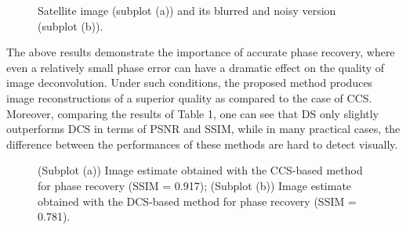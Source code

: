 \pdfoutput=1 \documentclass[journal]{IEEEtran}
\begin{document}
\begin{figure}[!t]
\caption{Satellite image (subplot (a)) and its blurred and noisy version (subplot (b)).}
\label{fig12}
\end{figure}

The above results demonstrate the importance of accurate phase recovery, where even a relatively small phase error can have a dramatic effect on the quality of image deconvolution. Under such conditions, the proposed method produces image reconstructions of a superior quality as compared to the case of CCS. Moreover, comparing the results of Table 1, one can see that DS only slightly outperforms DCS in terms of PSNR and SSIM, while in many practical cases, the difference between the performances of these methods are hard to detect visually.

\begin{figure}[t]
\caption{(Subplot (a)) Image estimate obtained with the CCS-based method for phase recovery (SSIM = 0.917); (Subplot (b)) Image estimate obtained with the DCS-based method for phase recovery (SSIM = 0.781).}
\label{fig11}
\end{figure}
\end{document}
